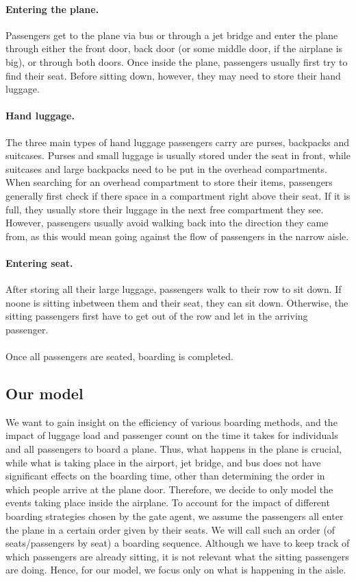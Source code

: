 \documentclass[11pt]{article}
\begin{document}
\paragraph{Entering the plane.}
Passengers get to the plane via bus or through a jet bridge and enter the plane through either the front door, back door (or some middle door, if the airplane is big), or through both doors. Once inside the plane, passengers usually first try to find their seat.  Before sitting down, however, they may need to store their hand luggage. 
\paragraph{Hand luggage.} The three main types of hand luggage passengers carry are purses, backpacks and suitcases. Purses and small luggage is usually stored under the seat in front, while suitcases and large backpacks need to be put in the overhead compartments. When searching for an overhead compartment to store their items, passengers generally first check if there space in a compartment right above their seat. If it is full, they usually store their luggage in the next free compartment they see. However, passengers usually avoid walking back into the direction they came from, as this would mean going against the flow of passengers in the narrow aisle.

\paragraph{Entering seat.} After storing all their large luggage, passengers walk to their row to sit down. If noone is sitting inbetween them and their seat, they can sit down. Otherwise, the sitting passengers first have to get out of the row and let in the arriving passenger.
\\\\
Once all passengers are seated, boarding is completed.

\subsection{Our model}\label{ourmodel}

We want to gain insight on the efficiency of various boarding methods, and the impact of luggage load and passenger count on the time it takes for individuals and all passengers to board a plane. Thus, what happens in the plane is crucial, while what is taking place in the airport, jet bridge, and bus does not have significant effects on the boarding time, other than determining the order in which people arrive at the plane door. Therefore, we decide to only model the events taking place inside the airplane. To account for the impact of different boarding strategies chosen by the gate agent, we assume the passengers all enter the plane in a certain order given by their seats. We will call such an order (of seats/passengers by seat) a boarding sequence.
Although we have to keep track of which passengers are already sitting, it is not relevant what the sitting passengers are doing. Hence, for our model, we focus only on what is happening in the aisle.
\end{document}
